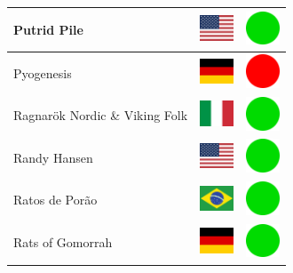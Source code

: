 \documentclass[12pt, a4paper, twoside]{report}
\begin{document}
\begin{center}
\begin{longtable}{|p{5cm}|p{2cm}|p{2cm}|}
 Putrid Pile                                                & \includegraphics[width=1cm]{../img/flags/us} &   \includegraphics[width=1cm]{../likes/y} \\ \hline
 Pyogenesis                                                 & \includegraphics[width=1cm]{../img/flags/de} &   \includegraphics[width=1cm]{../likes/n} \\ \hline
 Ragnarök Nordic \& Viking Folk                             & \includegraphics[width=1cm]{../img/flags/it} &   \includegraphics[width=1cm]{../likes/y} \\ \hline
 Randy Hansen                                               & \includegraphics[width=1cm]{../img/flags/us} &   \includegraphics[width=1cm]{../likes/y} \\ \hline
 Ratos de Porão                                             & \includegraphics[width=1cm]{../img/flags/br} &   \includegraphics[width=1cm]{../likes/y} \\ \hline
 Rats of Gomorrah                                           & \includegraphics[width=1cm]{../img/flags/de} &   \includegraphics[width=1cm]{../likes/y} \\ \hline

\end{longtable}
\end{center}
\end{document}
